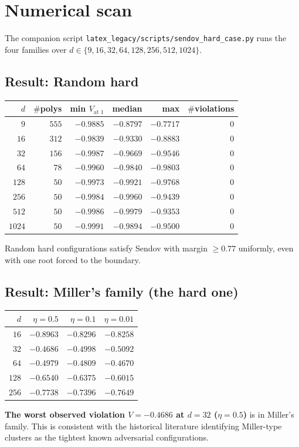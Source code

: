 \documentclass[11pt,a4paper]{article}
\begin{document}
\section{Numerical scan}\label{sec:scan}

The companion script \verb|latex_legacy/scripts/sendov_hard_case.py| runs the four families over $d \in \{9, 16, 32, 64, 128, 256, 512, 1024\}$.

\subsection{Result: Random hard}
\begin{center}
\begin{tabular}{rrrrrr}
\toprule
$d$ & $\#$polys & min $V_{\text{at }1}$ & median & max & $\#$violations \\
\midrule
$9$    & $555$ & $-0.9885$ & $-0.8797$ & $-0.7717$ & $0$ \\
$16$   & $312$ & $-0.9839$ & $-0.9330$ & $-0.8883$ & $0$ \\
$32$   & $156$ & $-0.9987$ & $-0.9669$ & $-0.9546$ & $0$ \\
$64$   & $78$  & $-0.9960$ & $-0.9840$ & $-0.9803$ & $0$ \\
$128$  & $50$  & $-0.9973$ & $-0.9921$ & $-0.9768$ & $0$ \\
$256$  & $50$  & $-0.9984$ & $-0.9960$ & $-0.9439$ & $0$ \\
$512$  & $50$  & $-0.9986$ & $-0.9979$ & $-0.9353$ & $0$ \\
$1024$ & $50$  & $-0.9991$ & $-0.9894$ & $-0.9500$ & $0$ \\
\bottomrule
\end{tabular}
\end{center}
Random hard configurations satisfy Sendov with margin $\ge 0.77$ uniformly, even with one root forced to the boundary.

\subsection{Result: Miller's family (the hard one)}
\begin{center}
\begin{tabular}{rrrr}
\toprule
$d$ & $\eta = 0.5$ & $\eta = 0.1$ & $\eta = 0.01$ \\
\midrule
$16$  & $-0.8963$ & $-0.8296$ & $-0.8258$ \\
$32$  & $\mathbf{-0.4686}$ & $-0.4998$ & $-0.5092$ \\
$64$  & $-0.4979$ & $-0.4809$ & $-0.4670$ \\
$128$ & $-0.6540$ & $-0.6375$ & $-0.6015$ \\
$256$ & $-0.7738$ & $-0.7396$ & $-0.7649$ \\
\bottomrule
\end{tabular}
\end{center}
\textbf{The worst observed violation $V = -0.4686$ at $d = 32$ ($\eta = 0.5$)} is in Miller's family. This is consistent with the historical literature identifying Miller-type clusters as the tightest known adversarial configurations.
\end{document}
